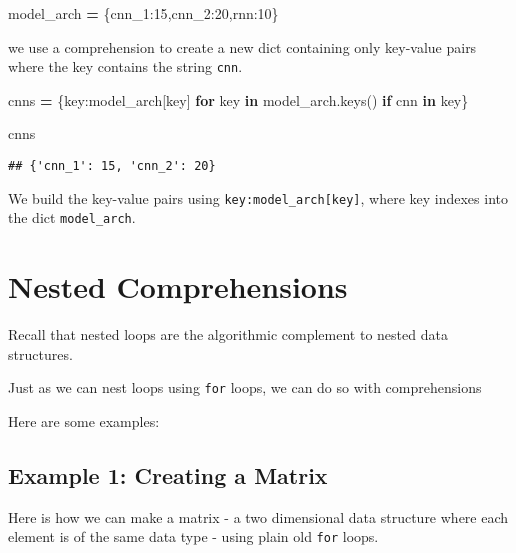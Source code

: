 \documentclass[
]{book}
\newenvironment{Shaded}{\begin{snugshade}}{\end{snugshade}}
\newcommand{\ControlFlowTok}[1]{\textcolor[rgb]{0.13,0.29,0.53}{\textbf{#1}}}
\newcommand{\DecValTok}[1]{\textcolor[rgb]{0.00,0.00,0.81}{#1}}
\newcommand{\KeywordTok}[1]{\textcolor[rgb]{0.13,0.29,0.53}{\textbf{#1}}}
\newcommand{\NormalTok}[1]{#1}
\newcommand{\OperatorTok}[1]{\textcolor[rgb]{0.81,0.36,0.00}{\textbf{#1}}}
\newcommand{\StringTok}[1]{\textcolor[rgb]{0.31,0.60,0.02}{#1}}
\begin{document}
\begin{Shaded}
\begin{Highlighting}[]
\NormalTok{model\_arch }\OperatorTok{=}\NormalTok{ \{}\StringTok{\textquotesingle{}cnn\_1\textquotesingle{}}\NormalTok{:}\DecValTok{15}\NormalTok{,}\StringTok{\textquotesingle{}cnn\_2\textquotesingle{}}\NormalTok{:}\DecValTok{20}\NormalTok{,}\StringTok{\textquotesingle{}rnn\textquotesingle{}}\NormalTok{:}\DecValTok{10}\NormalTok{\}}
\end{Highlighting}
\end{Shaded}

we use a comprehension to create a new dict containing only key-value pairs where the key contains the string \texttt{cnn}.

\begin{Shaded}
\begin{Highlighting}[]
\NormalTok{cnns }\OperatorTok{=}\NormalTok{ \{key:model\_arch[key] }\ControlFlowTok{for}\NormalTok{ key }\KeywordTok{in}\NormalTok{ model\_arch.keys() }\ControlFlowTok{if} \StringTok{\textquotesingle{}cnn\textquotesingle{}} \KeywordTok{in}\NormalTok{ key\}}

\NormalTok{cnns}
\end{Highlighting}
\end{Shaded}

\begin{verbatim}
## {'cnn_1': 15, 'cnn_2': 20}
\end{verbatim}

We build the key-value pairs using \texttt{key:model\_arch{[}key{]}}, where key indexes into the dict \texttt{model\_arch}.

\section{Nested Comprehensions}\label{nested-comprehensions}

Recall that nested loops are the algorithmic complement to nested data structures.

Just as we can nest loops using \texttt{for} loops, we can do so with comprehensions

Here are some examples:

\subsection{Example 1: Creating a Matrix}\label{example-1-creating-a-matrix}

Here is how we can make a matrix - a two dimensional data structure where each element is of the same data type - using plain old \texttt{for} loops.
\end{document}
